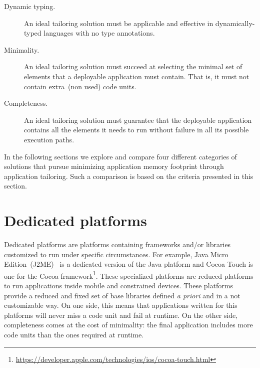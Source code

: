 \begin{description}
\item[Dynamic typing.] An ideal tailoring solution must be applicable and effective in dynamically-typed languages \ie with no type annotations.

\item[Minimality.] An ideal tailoring solution must succeed at selecting the minimal set of elements that a deployable application must contain. That is, it must not contain extra~(non used) code units.

\item[Completeness.] An ideal tailoring solution must guarantee that the deployable application contains all the elements it needs to run without failure in all its possible execution paths.

\end{description}

In the following sections we explore and compare four different categories of solutions that pursue minimizing application memory footprint through application tailoring. Such a comparison is based on the criteria presented in this section.


\section{Dedicated platforms}%
\label{section:static_selection_rw}

Dedicated platforms are platforms containing frameworks and/or libraries customized to run under specific circumstances. For example, Java Micro Edition~(J2ME)~\cite{JavaME} is a dedicated version of the Java platform and Cocoa Touch is one for the Cocoa framework\footnote{\url{https://developer.apple.com/technologies/ios/cocoa-touch.html}}. These specialized platforms are reduced platforms to run applications inside mobile and constrained devices. These platforms provide a reduced and fixed set of base libraries defined \emph{a priori} and in a not customizable way. On one side, this means that applications written for this platforms will never miss a code unit and fail at runtime. On the other side, completeness comes at the cost of minimality: the final application includes more code units than the ones required at runtime.

